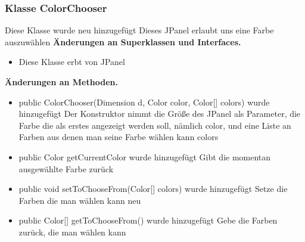 \documentclass{article}
\begin{document}
	\subsubsection{Klasse ColorChooser}
    Diese Klasse wurde neu hinzugefügt
    Dieses JPanel erlaubt uns eine Farbe auszuwählen
	    \textbf{Änderungen an Superklassen und Interfaces.}\newline
	   \begin{itemize}
            \item Diese Klasse erbt von JPanel\newline
           \end{itemize}
    \textbf{Änderungen an Methoden.}\newline
	   \begin{itemize}
           \item public ColorChooser(Dimension d, Color color, Color[] colors) wurde hinzugefügt\newline
               Der Konstruktor nimmt die Größe des JPanel als Parameter,
               die Farbe die als erstes angezeigt werden soll, nämlich color,
               und eine Liste an Farben aus denen man seine Farbe wählen kann colors
           \item public Color getCurrentColor wurde hinzugefügt\newline
               Gibt die momentan ausgewählte Farbe zurück
           \item public void setToChooseFrom(Color[] colors) wurde hinzugefügt\newline
               Setze die Farben die man wählen kann neu
           \item public Color[] getToChooseFrom() wurde hinzugefügt\newline
               Gebe die Farben zurück, die man wählen kann
           \end{itemize}
\end{document}
